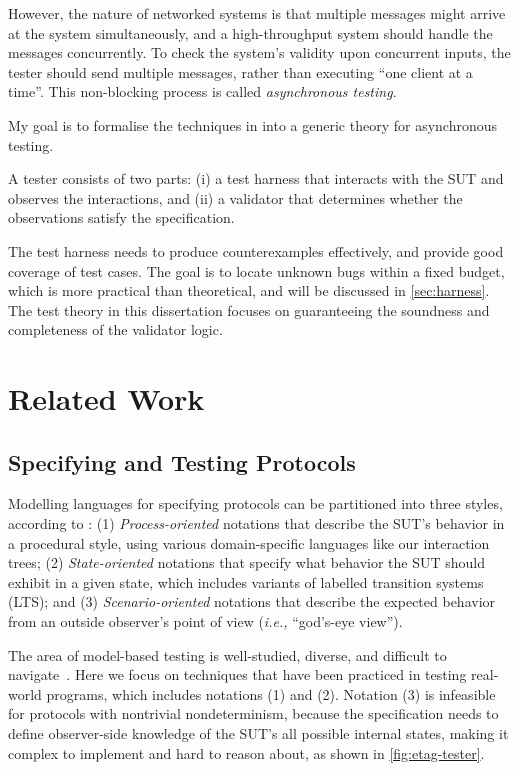 \documentclass[12pt,oneside]{amsbook}
\numberwithin{section}{chapter}
\numberwithin{figure}{chapter}
\numberwithin{equation}{chapter}
\begin{document}
However, the nature of networked systems is that multiple messages might arrive
at the system simultaneously, and a high-throughput system should handle the
messages concurrently.  To check the system's validity upon concurrent inputs,
the tester should send multiple messages, rather than executing ``one client at
a time''.  This non-blocking process is called {\em asynchronous testing}.

My goal is to formalise the techniques in \textcite{issta21} into a generic
theory for asynchronous testing.

A tester consists of two parts: (i) a test harness that interacts with the SUT
and observes the interactions, and (ii) a validator that determines whether the
observations satisfy the specification.

The test harness needs to produce counterexamples effectively, and provide good
coverage of test cases.  The goal is to locate unknown bugs within a fixed
budget, which is more practical than theoretical, and will be discussed in
\autoref{sec:harness}.  The test theory in this dissertation focuses on
guaranteeing the soundness and completeness of the validator logic.

\chapter{Related Work}
\label{chap:related-work}

\section{Specifying and Testing Protocols}
Modelling languages for specifying protocols can be partitioned into three
styles, according to \textcite{anand2013orchestrated}: (1) {\em Process-oriented}
notations that describe the SUT's behavior in a procedural style, using various
domain-specific languages like our interaction trees; (2) {\em State-oriented}
notations that specify what behavior the SUT should exhibit in a given state,
which includes variants of labelled transition systems (LTS); and (3) {\em
  Scenario-oriented} notations that describe the expected behavior from an
outside observer's point of view ({\it i.e.,} ``god's-eye view'').

The area of model-based testing is well-studied, diverse, and difficult to
navigate~\cite{anand2013orchestrated}.  Here we focus on techniques that have
been practiced in testing real-world programs, which includes notations (1) and
(2).  Notation (3) is infeasible for protocols with nontrivial nondeterminism,
because the specification needs to define observer-side knowledge of the SUT's
all possible internal states, making it complex to implement and hard to reason
about, as shown in \autoref{fig:etag-tester}.
\end{document}
